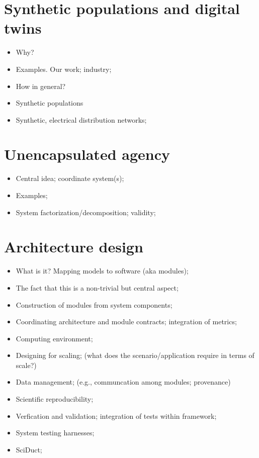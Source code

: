 \documentclass[12pt]{book}
\begin{document}
\section{Synthetic populations and digital twins}

\begin{itemize}
\item Why?
\item Examples. Our work; industry;
\item How in general?
\item Synthetic populations
\item Synthetic, electrical distribution networks;
\end{itemize}


\section{Unencapsulated agency}

\begin{itemize}
\item Central idea; coordinate system(s);
\item Examples;
\item System factorization/decomposition; validity;
\end{itemize}
%


\section{Architecture design}


\begin{itemize}
\item What is it? Mapping models to software (aka modules);
\item The fact that this is a non-trivial but central aspect;
\item Construction of modules from system components;
\item Coordinating architecture and module contracts; integration of metrics;
\item Computing environment;
\item Designing for scaling; (what does the scenario/application
  require in terms of scale?)
\item Data management; (e.g., communcation among modules; provenance)
\item Scientific reproducibility;
\item Verfication and validation; integration of tests within framework;
\item System testing harnesses;
\item SciDuct;
\end{itemize}
\end{document}
